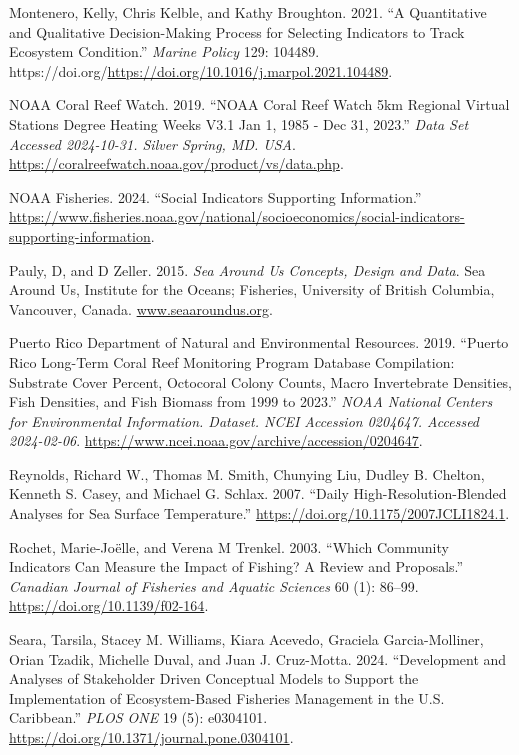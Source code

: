 \documentclass[
  letterpaper,
  oneside,
  open=any]{scrbook}
\newlength{\cslhangindent}
\newenvironment{CSLReferences}[2] %
 {\begin{list}{}{%
  \setlength{\itemindent}{0pt}
  \setlength{\leftmargin}{0pt}
  \setlength{\parsep}{0pt}
  \ifodd #1
   \setlength{\leftmargin}{\cslhangindent}
   \setlength{\itemindent}{-1\cslhangindent}
  \fi
  \setlength{\itemsep}{#2\baselineskip}}}
 {\end{list}}
\begin{document}
\begin{CSLReferences}{1}{0}
Montenero, Kelly, Chris Kelble, and Kathy Broughton. 2021. {``A
Quantitative and Qualitative Decision-Making Process for Selecting
Indicators to Track Ecosystem Condition.''} \emph{Marine Policy} 129:
104489.
https://doi.org/\url{https://doi.org/10.1016/j.marpol.2021.104489}.

NOAA Coral Reef Watch. 2019. {``NOAA Coral Reef Watch 5km Regional
Virtual Stations Degree Heating Weeks V3.1 Jan 1, 1985 - Dec 31,
2023.''} \emph{Data Set Accessed 2024-10-31. Silver Spring, MD. USA}.
\url{https://coralreefwatch.noaa.gov/product/vs/data.php}.

NOAA Fisheries. 2024. {``Social Indicators Supporting Information.''}
\url{https://www.fisheries.noaa.gov/national/socioeconomics/social-indicators-supporting-information}.

Pauly, D, and D Zeller. 2015. \emph{Sea Around Us Concepts, Design and
Data}. Sea Around Us, Institute for the Oceans; Fisheries, University of
British Columbia, Vancouver, Canada.
\href{https://www.seaaroundus.org}{www.seaaroundus.org}.

Puerto Rico Department of Natural and Environmental Resources. 2019.
{``Puerto Rico Long-Term Coral Reef Monitoring Program Database
Compilation: Substrate Cover Percent, Octocoral Colony Counts, Macro
Invertebrate Densities, Fish Densities, and Fish Biomass from 1999 to
2023.''} \emph{NOAA National Centers for Environmental Information.
Dataset. NCEI Accession 0204647. Accessed 2024-02-06}.
\url{https://www.ncei.noaa.gov/archive/accession/0204647}.

Reynolds, Richard W., Thomas M. Smith, Chunying Liu, Dudley B. Chelton,
Kenneth S. Casey, and Michael G. Schlax. 2007. {``Daily
High-Resolution-Blended Analyses for Sea Surface Temperature.''}
\url{https://doi.org/10.1175/2007JCLI1824.1}.

Rochet, Marie-Joëlle, and Verena M Trenkel. 2003. {``Which Community
Indicators Can Measure the Impact of Fishing? A Review and Proposals.''}
\emph{Canadian Journal of Fisheries and Aquatic Sciences} 60 (1):
86--99. \url{https://doi.org/10.1139/f02-164}.

Seara, Tarsila, Stacey M. Williams, Kiara Acevedo, Graciela
Garcia-Molliner, Orian Tzadik, Michelle Duval, and Juan J. Cruz-Motta.
2024. {``Development and Analyses of Stakeholder Driven Conceptual
Models to Support the Implementation of Ecosystem-Based Fisheries
Management in the U.S. Caribbean.''} \emph{PLOS ONE} 19 (5): e0304101.
\url{https://doi.org/10.1371/journal.pone.0304101}.


\end{CSLReferences}
\end{document}
